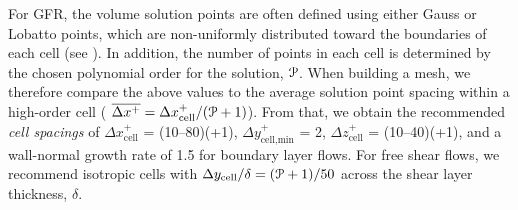 For GFR, the volume solution points are often defined using either
Gauss or Lobatto points, which are non-uniformly distributed toward the
boundaries of each cell (see ).
%
In addition, the number of points in each cell is determined by the
chosen polynomial order for the solution, ${\cal P}$.
%
When building a mesh, we therefore compare the above values to the
average solution point spacing within a high-order cell (\thatis
$\overline{\Delta x^+} = \Delta x^+_\text{cell} / ({\cal P}+1)$).
%
From that, we obtain the recommended \emph{cell spacings} of
$\Delta x^+_\text{cell}$ = (10--80)(\PO+1),
$\Delta y^+_\text{cell,min}$ = 2,
$\Delta z^+_\text{cell}$ = (10--40)(\PO+1),
and a wall-normal growth rate of 1.5 for boundary layer flows.
%
For free shear flows, we recommend isotropic cells with 
$\Delta y_\text{cell} / \delta = ({\cal P}+1) / 50$ across the
shear layer thickness, $\delta$.
 


